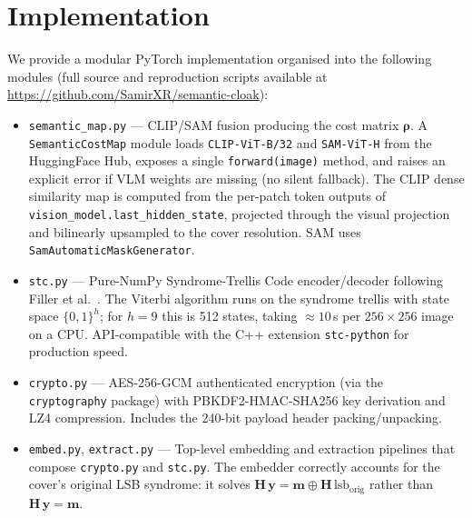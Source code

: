 \documentclass[10pt,a4paper]{article}
\newcommand{\cost}{\boldsymbol{\rho}}
\newcommand{\msg}{\mathbf{m}}
\newcommand{\modv}{\mathbf{y}}
\newcommand{\Hmat}{\mathbf{H}}
\begin{document}
\section{Implementation}
\label{sec:impl}

We provide a modular PyTorch implementation organised into the
following modules (full source and reproduction scripts available at
\url{https://github.com/SamirXR/semantic-cloak}):

\begin{itemize}[leftmargin=2.2em,itemsep=2pt,topsep=2pt]
    \item \texttt{semantic\_map.py} --- CLIP/SAM fusion producing
          the cost matrix $\cost$. A \texttt{SemanticCostMap} module
          loads \texttt{CLIP-ViT-B/32} and \texttt{SAM-ViT-H} from
          the HuggingFace Hub, exposes a single \texttt{forward(image)}
          method, and raises an explicit error if VLM weights are
          missing (no silent fallback). The CLIP dense similarity map
          is computed from the per-patch token outputs of
          \texttt{vision\_model.last\_hidden\_state}, projected through
          the visual projection and bilinearly upsampled to the cover
          resolution. SAM uses \texttt{SamAutomaticMaskGenerator}.
    \item \texttt{stc.py} --- Pure-NumPy Syndrome-Trellis Code
          encoder/decoder following Filler et al.~\cite{filler2011stc}.
          The Viterbi algorithm runs on the syndrome trellis with
          state space $\{0,1\}^h$; for $h=9$ this is 512 states, taking
          $\approx 10$\,s per $256{\times}256$ image on a CPU.
          API-compatible with the C++ extension \texttt{stc-python}
          for production speed.
    \item \texttt{crypto.py} --- AES-256-GCM authenticated encryption
          (via the \texttt{cryptography} package) with PBKDF2-HMAC-SHA256
          key derivation and LZ4 compression. Includes the 240-bit
          payload header packing/unpacking.
    \item \texttt{embed.py}, \texttt{extract.py} --- Top-level
          embedding and extraction pipelines that compose
          \texttt{crypto.py} and \texttt{stc.py}. The embedder
          correctly accounts for the cover's original LSB syndrome:
          it solves $\Hmat\,\modv = \msg \oplus \Hmat\,\text{lsb}_{\text{orig}}$
          rather than $\Hmat\,\modv = \msg$.

\end{itemize}
\end{document}
